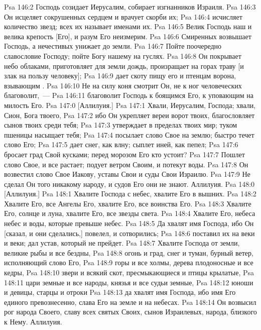 \vs Psa 146:2 Господь созидает Иерусалим, собирает изгнанников Израиля.
\vs Psa 146:3 Он исцеляет сокрушенных сердцем и врачует скорби их;
\vs Psa 146:4 исчисляет количество звезд; всех их называет именами их.
\vs Psa 146:5 Велик Господь наш и велика крепость [Его], и разум Его неизмерим.
\vs Psa 146:6 Смиренных возвышает Господь, а нечестивых унижает до земли.
\vs Psa 146:7 Пойте поочередно славословие Господу; пойте Богу нашему на гуслях.
\vs Psa 146:8 Он покрывает небо облаками, приготовляет для земли дождь, произращает на горах траву [и злак на пользу человеку];
\vs Psa 146:9 дает скоту пищу его и птенцам ворона, взывающим .
\vs Psa 146:10 Не на силу коня смотрит Он, не к  ног человеческих благоволит,~---
\vs Psa 146:11 благоволит Господь к боящимся Его, к уповающим на милость Его.
\vs Psa 147:0 [Аллилуия.]
\rsbpar\vs Psa 147:1 Хвали, Иерусалим, Господа; хвали, Сион, Бога твоего,
\vs Psa 147:2 ибо Он укрепляет вереи ворот твоих, благословляет сынов твоих среди тебя;
\vs Psa 147:3 утверждает в пределах твоих мир; туком пшеницы насыщает тебя;
\vs Psa 147:4 посылает слово Свое на землю; быстро течет слово Его;
\vs Psa 147:5 дает снег, как влну; сыплет иней, как пепел;
\vs Psa 147:6 бросает град Свой кусками; перед морозом Его кто устоит?
\vs Psa 147:7 Пошлет слово Свое, и все растает; подует ветром Своим, и потекут воды.
\vs Psa 147:8 Он возвестил слово Свое Иакову, уставы Свои и суды Свои Израилю.
\vs Psa 147:9 Не сделал Он того никакому  народу, и судов Его они не знают. Аллилуия.
\vs Psa 148:0 [Аллилуия.]
\rsbpar\vs Psa 148:1 Хвалите Господа с небес, хвалите Его в вышних.
\vs Psa 148:2 Хвалите Его, все Ангелы Его, хвалите Его, все воинства Его.
\vs Psa 148:3 Хвалите Его, солнце и луна, хвалите Его, все звезды света.
\vs Psa 148:4 Хвалите Его, небеса небес и воды, которые превыше небес.
\vs Psa 148:5 Да хвалят имя Господа, ибо Он [сказал, и они сделались,] повелел, и сотворились;
\vs Psa 148:6 поставил их на веки и веки; дал устав, который не прейдет.
\vs Psa 148:7 Хвалите Господа от земли, великие рыбы и все бездны,
\vs Psa 148:8 огонь и град, снег и туман, бурный ветер, исполняющий слово Его,
\vs Psa 148:9 горы и все холмы, дерева плодоносные и все кедры,
\vs Psa 148:10 звери и всякий скот, пресмыкающиеся и птицы крылатые,
\vs Psa 148:11 цари земные и все народы, князья и все судьи земные,
\vs Psa 148:12 юноши и девицы, старцы и отроки
\vs Psa 148:13 да хвалят имя Господа, ибо имя Его единого превознесенно, слава Его на земле и на небесах.
\vs Psa 148:14 Он возвысил рог народа Своего, славу всех святых Своих, сынов Израилевых, народа, близкого к Нему. Аллилуия.
